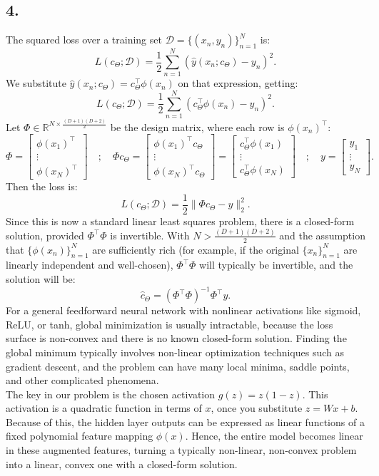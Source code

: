 \documentclass[12pt,a4paper]{article}
\begin{document}
    \newpage
    \subsection{4.}
        The squared loss over a training set \(\mathcal{D} = \{(x_n,y_n)\}_{n=1}^N\) is:
        \[L(c_\Theta; \mathcal{D}) = \frac{1}{2}\sum_{n=1}^N (\hat{y}(x_n; c_\Theta) - y_n)^2.\]
        We substitute \(\hat{y}(x_n; c_\Theta) = c_\Theta^\top \phi(x_n)\) on that expression, getting:
        \[L(c_\Theta; \mathcal{D}) = \frac{1}{2}\sum_{n=1}^N (c_\Theta^\top \phi(x_n) - y_n)^2.\]
        Let \(\Phi \in \mathbb{R}^{N \times \frac{(D+1)(D+2)}{2}}\) be the design matrix, where each row is \(\phi(x_n)^\top\):
        \[\Phi = \begin{bmatrix} \phi(x_1)^\top \\ \vdots \\ \phi(x_N)^\top \end{bmatrix}
        \quad ; \quad
        \Phi c_\Theta = \begin{bmatrix} \phi(x_1)^\top c_\Theta \\ \vdots \\ \phi(x_N)^\top c_\Theta \end{bmatrix}
        = \begin{bmatrix} c_\Theta^\top \phi(x_1) \\ \vdots \\ c_\Theta^\top \phi(x_N) \end{bmatrix}
        \quad ; \quad
        y = \begin{bmatrix} y_1 \\ \vdots \\ y_N \end{bmatrix}.\]
        Then the loss is:
        \[L(c_\Theta; \mathcal{D}) = \frac{1}{2}\| \Phi c_\Theta - y \|_2^2.\]
        Since this is now a standard linear least squares problem, there is a closed-form solution, provided \(\Phi^\top \Phi\) is invertible. With \(N > \frac{(D+1)(D+2)}{2}\) and the assumption that \(\{\phi(x_n)\}_{n=1}^N\) are sufficiently rich (for example, if the original \(\{x_n\}_{n=1}^N\) are linearly independent and well-chosen), \(\Phi^\top \Phi\) will typically be invertible, and the solution will be:
        \[\hat{c}_\Theta = (\Phi^\top \Phi)^{-1} \Phi^\top y.\]
        For a general feedforward neural network with nonlinear activations like sigmoid, ReLU, or tanh, global minimization is usually intractable, because the loss surface is non-convex and there is no known closed-form solution. Finding the global minimum typically involves non-linear optimization techniques such as gradient descent, and the problem can have many local minima, saddle points, and other complicated phenomena. \\
        The key in our problem is the chosen activation \(g(z) = z(1-z)\). This activation is a quadratic function in terms of \(x\), once you substitute \(z = Wx + b\). Because of this, the hidden layer outputs can be expressed as linear functions of a fixed polynomial feature mapping \(\phi(x)\). Hence, the entire model becomes linear in these augmented features, turning a typically non-linear, non-convex problem into a linear, convex one with a closed-form solution.
\end{document}
